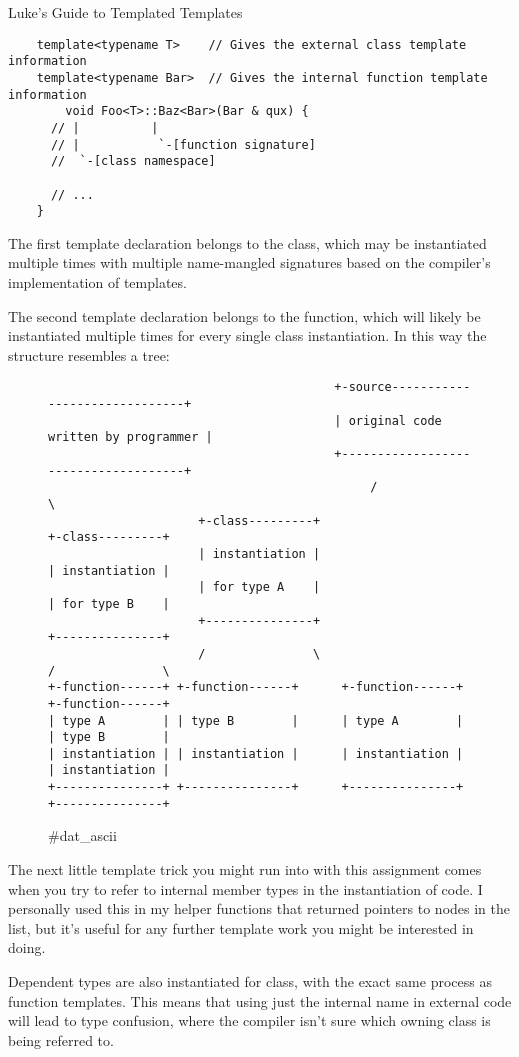 \begin{section}{Luke's Guide to Templated Templates}
 \begin{verbatim}
    template<typename T>    // Gives the external class template information
    template<typename Bar>  // Gives the internal function template information
		void Foo<T>::Baz<Bar>(Bar & qux) {
      // |          |
      // |           `-[function signature]
      //  `-[class namespace]

      // ...
    }
 \end{verbatim}


 \indent The first template declaration belongs to the class, which may be instantiated
 multiple times with multiple name-mangled signatures based on the compiler's
 implementation of templates.

 \indent The second template declaration belongs to the function, which will likely be
 instantiated multiple times for every single class instantiation. In this way
 the structure resembles a tree:


 \begin{figure}[h]
	 \centering
	 \begin{verbatim}
										+-source------------------------------+
										| original code written by programmer |
										+-------------------------------------+
											 /                               \
					 +-class---------+                     +-class---------+
					 | instantiation |                     | instantiation |
					 | for type A    |                     | for type B    |
					 +---------------+                     +---------------+
					 /               \                     /               \
+-function------+ +-function------+      +-function------+ +-function------+
| type A        | | type B        |      | type A        | | type B        |
| instantiation | | instantiation |      | instantiation | | instantiation |
+---------------+ +---------------+      +---------------+ +---------------+
	\end{verbatim}
	 \caption{\#dat\_ascii\surprisevolpy}
 \end{figure}



 \pagebreak
 \indent The next little template trick you might run into with this assignment comes
 when you try to refer to internal member types in the instantiation of code.
 I personally used this in my helper functions that returned pointers to nodes
 in the list, but it's useful for any further template work you might be
 interested in doing.

 \indent Dependent types are also instantiated for  class, with the exact same
 process as function templates. This means that using just the internal name
 in external code will lead to type confusion, where the compiler isn't sure
 which owning class is being referred to.


\end{section}
